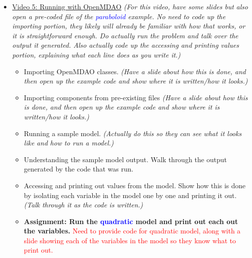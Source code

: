 \documentclass[12pt, letterpaper]{article}
\begin{document}
\begin{itemize}
	\item \underline{Video 5: Running with OpenMDAO} \textit{(For this video, have some slides but also open a pre-coded file of the \textcolor{blue}{paraboloid} example. No need to code up the importing portion, they likely will already be familiar with how that works, or it is straightforward enough. Do actually run the problem and talk over the output it generated. Also actually code up the accessing and printing values portion, explaining what each line does as you write it.)}
		\begin{itemize}
			\item Importing OpenMDAO classes. \textit{(Have a slide about how this is done, and then open up the example code and show where it is written/how it looks.)}
			\item Importing components from pre-existing files \textit{(Have a slide about how this is done, and then open up the example code and show where it is written/how it looks.)}
			\item Running a sample model. \textit{(Actually do this so they can see what it looks like and how to run a model.)}
			\item Understanding the sample model output. Walk through the output generated by the code that was run.
			\item Accessing and printing out values from the model. Show how this is done by isolating each variable in the model one by one and printing it out. \textit{(Talk through it as the code is written.)}
			\item \textbf{Assignment: Run the \textcolor{blue}{quadratic} model and print out each out the variables.} \textcolor{red}{Need to provide code for quadratic model, along with a slide showing each of the variables in the model so they know what to print out.}
		\end{itemize}


\end{itemize}
\end{document}
